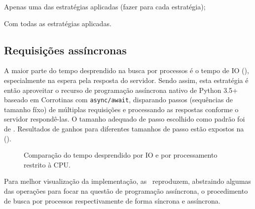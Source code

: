 
\begin{todolist}
    \item Apenas uma das estratégias aplicadas (fazer para cada estratégia);
    \item Com todas as estratégias aplicadas.
\end{todolist}

\subsection{Requisições assíncronas}

A maior parte do tempo desprendido na busca por processos é o tempo de IO
(), especialmente na espera pela resposta do
servidor. Sendo assim, esta estratégia é então aproveitar o recurso de
programação assíncrona nativo de Python 3.5+ baseado em Corrotinas com
\texttt{async/await}, disparando passos (sequências de tamanho fíxo) de
múltiplas requisições e processando as respostas conforme o servidor
respondê-las. O tamanho adequado de passo escolhido como padrão foi de
. Resultados de ganhos para diferentes tamanhos de passo estão
expostos na~
().

\begin{figure}[htb]
    \caption{Comparação do tempo desprendido por IO e por processamento restrito à CPU.}
    \label{gra:tempo-io-vs-proc}
\end{figure}

Para melhor visualização da implementação,
as~
reproduzem, abstraindo algumas das operações para focar na questão de
programação assíncrona, o procedimento de busca por processos respectivamente
de forma síncrona e assíncrona.

